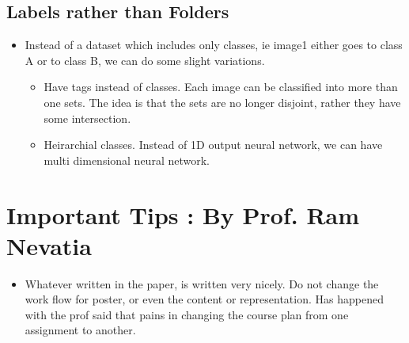 \documentclass{article}
\begin{document}
\subsection{Labels rather than Folders}
\begin{itemize}
\item Instead of a dataset which includes only classes, ie image1 either goes to class A or to class B, we can do some slight variations.
  \begin{itemize}
  \item Have tags instead of classes. Each image can be classified into more than one sets. The idea is that the sets are no longer disjoint, rather they have some intersection.
  \item Heirarchial classes. Instead of 1D output neural network, we can have multi dimensional neural network.
  \end{itemize}

\end{itemize}
\section{Important Tips : By Prof. Ram Nevatia}
\begin{itemize}
\item Whatever written in the paper, is written very nicely. Do not change the work flow for poster, or even the content or representation. Has happened with the prof said that pains in changing the course plan from one assignment to another. 
\end{itemize}
\end{document}
